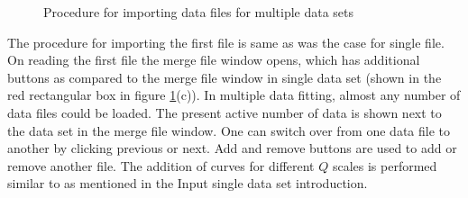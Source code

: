 \begin{figure}[htb]
\centering
\caption{Procedure for importing data files for multiple data sets}
\label{fig:QTmergeMultipleDS2}
\end{figure}
The procedure for importing the first file is same as was the case
for single file. On reading the first file the merge file window
opens, which has additional buttons as compared to the merge file
window in single data set (shown in the red rectangular box in
figure \ref{fig:QTmergeMultipleDS2}(c)). In multiple data fitting,
almost any number of data files could be loaded. The present active
number of data is shown next to the data set in the merge file
window. One can switch over from one data file to another by
clicking previous or next. Add and remove buttons are used to add or
remove another file. The addition of curves for different $Q$ scales
is performed similar to as mentioned in the Input single data set
introduction.

